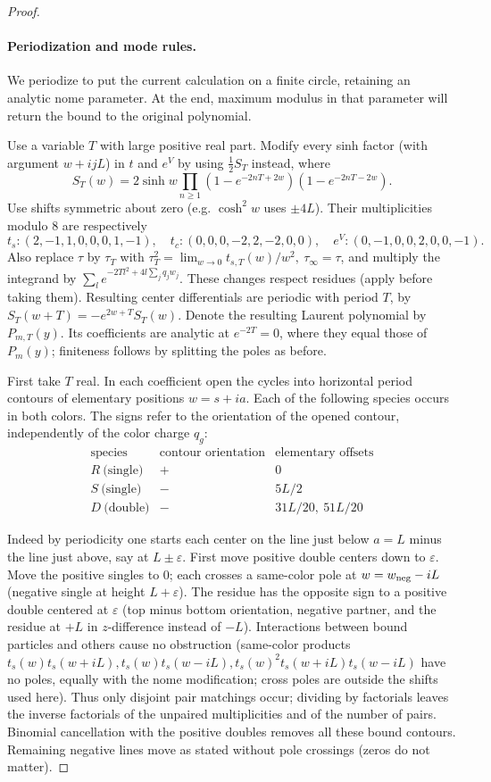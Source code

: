 \begin{proof}
\paragraph{Periodization and mode rules.}
We periodize to put the current calculation on a finite circle, retaining an analytic nome parameter. At the end, maximum modulus in that parameter will return the bound to the original polynomial.

Use a variable \(T\) with large positive real part. Modify every sinh factor (with argument \(w+ijL\)) in \(t\) and \(e^V\) by using \(\frac12 S_T\) instead, where
\[
 S_T(w)=2\sinh w\prod_{n\ge1}(1-e^{-2nT+2w})(1-e^{-2nT-2w}).
\]
Use shifts symmetric about zero (e.g. \(\cosh^2 w\) uses \(\pm4L\)). Their multiplicities modulo 8 are respectively
\[
 t_s:(2,-1,1,0,0,0,1,-1),\quad t_c:(0,0,0,-2,2,-2,0,0),\quad
 e^V:(0,-1,0,0,2,0,0,-1).
\]
Also replace \(\tau\) by \(\tau_T\) with \(\tau_T^2=\lim_{w\to0}t_{s,T}(w)/w^2,\ \tau_\infty=\tau\), and multiply the integrand by
\(\sum_l e^{-2Tl^2+4l\sum_j q_j w_j}\).
These changes respect residues (apply before taking them). Resulting center differentials are periodic with period \(T\), by \(S_T(w+T)=-e^{2w+T}S_T(w)\). Denote the resulting Laurent polynomial by \(P_{m,T}(y)\). Its coefficients are analytic at \(e^{-2T}=0\), where they equal those of \(P_m(y)\); finiteness follows by splitting the poles as before.

First take \(T\) real. In each coefficient open the cycles into horizontal
period contours of elementary positions \(w=s+ia\). Each of the following
species occurs in both colors. The signs refer to the orientation of
the opened contour, independently of the color charge \(q_g\):
\[
\begin{array}{c|c|c}
 \text{species}&\text{contour orientation}&\text{elementary offsets}\\\hline
 R\ \text{(single)}&+&0\\
 S\ \text{(single)}&-&5L/2\\
 D\ \text{(double)}&-&31L/20,\ 51L/20
\end{array}
\]

Indeed by periodicity one starts each center on the line just below \(a=L\) minus the line just above, say at \(L\pm\varepsilon\). First move positive double centers down to \(\varepsilon\). Move the positive singles to \(0\); each crosses a same-color pole at \(w=w_{\rm neg}-iL\) (negative single at height \(L+\varepsilon\)). The residue has the opposite sign to a positive double centered at \(\varepsilon\) (top minus bottom orientation, negative partner, and the residue at \(+L\) in \(z\)-difference instead of \(-L\)). Interactions between bound particles and others cause no obstruction (same-color products \(t_s(w)t_s(w+iL),t_s(w)t_s(w-iL),t_s(w)^2t_s(w+iL)t_s(w-iL)\) have no poles, equally with the nome modification; cross poles are outside the shifts used here). Thus only disjoint pair matchings occur; dividing by factorials leaves the inverse factorials of the unpaired multiplicities and of the number of pairs. Binomial cancellation with the positive doubles removes all these bound contours. Remaining negative lines move as stated without pole crossings (zeros do not matter).


\end{proof}
